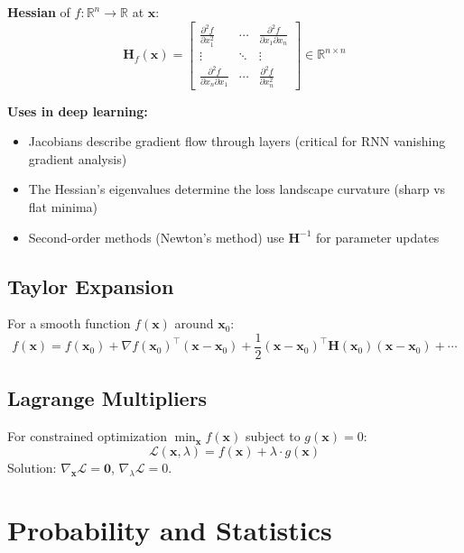 \textbf{Hessian} of $f: \mathbb{R}^n \to \mathbb{R}$ at $\mathbf{x}$:
\begin{equation}
\mathbf{H}_f(\mathbf{x}) = \begin{bmatrix}
\frac{\partial^2 f}{\partial x_1^2} & \cdots & \frac{\partial^2 f}{\partial x_1 \partial x_n} \\
\vdots & \ddots & \vdots \\
\frac{\partial^2 f}{\partial x_n \partial x_1} & \cdots & \frac{\partial^2 f}{\partial x_n^2}
\end{bmatrix} \in \mathbb{R}^{n \times n}
\end{equation}

\textbf{Uses in deep learning:}
\begin{itemize}
    \item Jacobians describe gradient flow through layers (critical for RNN vanishing gradient analysis)
    \item The Hessian's eigenvalues determine the loss landscape curvature (sharp vs flat minima)
    \item Second-order methods (Newton's method) use $\mathbf{H}^{-1}$ for parameter updates
\end{itemize}

\subsection{Taylor Expansion}

For a smooth function $f(\mathbf{x})$ around $\mathbf{x}_0$:
\begin{equation}
f(\mathbf{x}) = f(\mathbf{x}_0) + \nabla f(\mathbf{x}_0)^\top(\mathbf{x} - \mathbf{x}_0) + \frac{1}{2}(\mathbf{x} - \mathbf{x}_0)^\top \mathbf{H}(\mathbf{x}_0)(\mathbf{x} - \mathbf{x}_0) + \cdots
\end{equation}

\subsection{Lagrange Multipliers}

For constrained optimization $\min_{\mathbf{x}} f(\mathbf{x})$ subject to $g(\mathbf{x}) = 0$:
\begin{equation}
\mathcal{L}(\mathbf{x}, \lambda) = f(\mathbf{x}) + \lambda \cdot g(\mathbf{x})
\end{equation}
Solution: $\nabla_\mathbf{x} \mathcal{L} = \mathbf{0}$, $\nabla_\lambda \mathcal{L} = 0$.

\section{Probability and Statistics}

